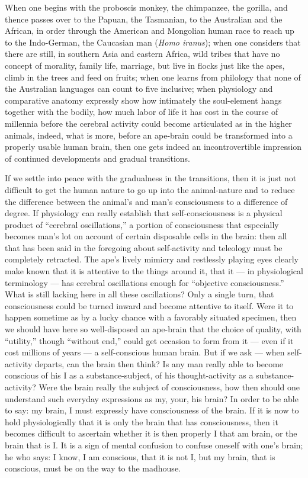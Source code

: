 \documentclass[12pt]{book}
\begin{document}
When one begins with the proboscis monkey, the chimpanzee, the gorilla, and thence passes
over to the Papuan, the Tasmanian, to the Australian and the African, in order through the
American and Mongolian human race to reach up to the Indo-German, the Caucasian man
(\textit{Homo iranus}); when one considers that there are still, in southern Asia and
eastern Africa, wild tribes that have no concept of morality, family life, marriage, but
live in flocks just like the apes, climb in the trees and feed on fruits; when one learns
from philology that none of the Australian languages can count to five inclusive; when
physiology and comparative anatomy expressly show how intimately the soul-element hangs
together with the bodily, how much labor of life it has cost in the course of millennia
before the cerebral activity could become articulated as in the higher animals, indeed,
what is more, before an ape-brain could be transformed into a properly usable human brain,
then one gets indeed an incontrovertible impression of continued developments and gradual
transitions.

If we settle into peace with the gradualness in the transitions, then it is just not
difficult to get the human nature to go up into the animal-nature and to reduce the
difference between the animal's and man's consciousness to a difference of degree. If
physiology can really establish that self-consciousness is a physical product of ``cerebral
oscillations,'' a portion of consciousness that especially becomes man's lot on account of
certain disposable cells in the brain: then all that has been said in the foregoing about
self-activity and teleology must be completely retracted. The ape's lively mimicry and
restlessly playing eyes clearly make known that it is attentive to the things around it,
that it --- in physiological terminology --- has cerebral oscillations enough for
``objective consciousness.'' What is still lacking here in all these oscillations? Only a
single turn, that consciousness could be turned inward and become attentive to itself. Were
it to happen sometime as by a lucky chance with a favorably situated specimen, then we
should have here so well-disposed an ape-brain that the choice of quality, with ``utility,''
though ``without end,'' could get occasion to form from it --- even if it cost millions of
years --- a self-conscious human brain. But if we ask --- when self-activity departs, can
the brain then think? Is any man really able to become conscious of his I as a
substance-subject, of his thought-activity as a substance-activity? Were the brain really
the subject of consciousness, how then should one understand such everyday expressions as my,
your, his brain? In order to be able to say: my brain, I must expressly have consciousness of
the brain. If it is now to hold physiologically that it is only the brain that has
consciousness, then it becomes difficult to ascertain whether it is then properly I that am
brain, or the brain that is I. It is a sign of mental confusion to confuse oneself with one's
brain; he who says: I know, I am conscious, that it is not I, but my brain, that is
conscious, must be on the way to the madhouse.
\end{document}
